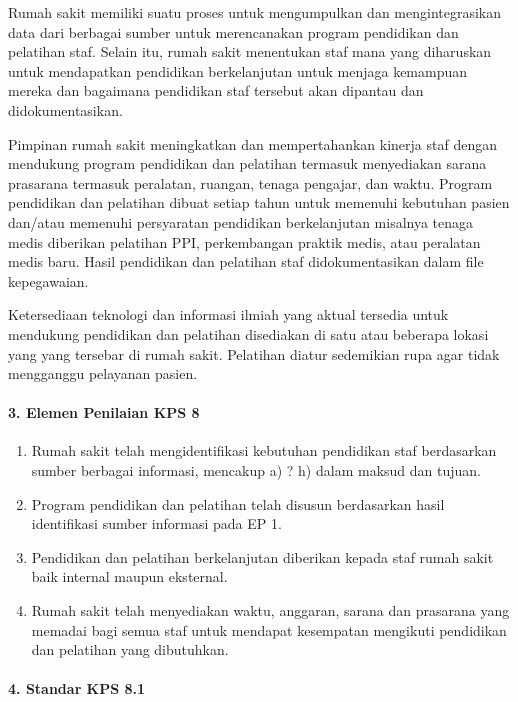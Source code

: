 \documentclass[
]{book}
\providecommand{\tightlist}{%
  \setlength{\itemsep}{0pt}\setlength{\parskip}{0pt}}
\begin{document}
Rumah sakit memiliki suatu proses untuk mengumpulkan dan mengintegrasikan data dari berbagai sumber untuk merencanakan program pendidikan dan pelatihan staf. Selain itu, rumah sakit menentukan staf mana yang diharuskan untuk mendapatkan pendidikan berkelanjutan untuk menjaga kemampuan mereka dan bagaimana pendidikan staf tersebut akan dipantau dan didokumentasikan.

Pimpinan rumah sakit meningkatkan dan mempertahankan kinerja staf dengan mendukung program pendidikan dan pelatihan termasuk menyediakan sarana prasarana termasuk peralatan, ruangan, tenaga pengajar, dan waktu. Program pendidikan dan pelatihan dibuat setiap tahun untuk memenuhi kebutuhan pasien dan/atau memenuhi persyaratan pendidikan berkelanjutan misalnya tenaga medis diberikan pelatihan PPI, perkembangan praktik medis, atau peralatan medis baru. Hasil pendidikan dan pelatihan staf didokumentasikan dalam file kepegawaian.

Ketersediaan teknologi dan informasi ilmiah yang aktual tersedia untuk mendukung pendidikan dan pelatihan disediakan di satu atau beberapa lokasi yang yang tersebar di rumah sakit. Pelatihan diatur sedemikian rupa agar tidak mengganggu pelayanan pasien.

\hypertarget{elemen-penilaian-kps-8}{%
\paragraph*{3. Elemen Penilaian KPS 8}\label{elemen-penilaian-kps-8}}

\begin{enumerate}
\def\labelenumi{\alph{enumi}.}
\tightlist
\item
  Rumah sakit telah mengidentifikasi kebutuhan pendidikan staf berdasarkan sumber berbagai informasi, mencakup a) ? h) dalam maksud dan tujuan.
\item
  Program pendidikan dan pelatihan telah disusun berdasarkan hasil identifikasi sumber informasi pada EP 1.
\item
  Pendidikan dan pelatihan berkelanjutan diberikan kepada staf rumah sakit baik internal maupun eksternal.
\item
  Rumah sakit telah menyediakan waktu, anggaran, sarana dan prasarana yang memadai bagi semua staf untuk mendapat kesempatan mengikuti pendidikan dan pelatihan yang dibutuhkan.
\end{enumerate}

\hypertarget{standar-kps-8.1}{%
\paragraph*{4. Standar KPS 8.1}\label{standar-kps-8.1}}
\end{document}

